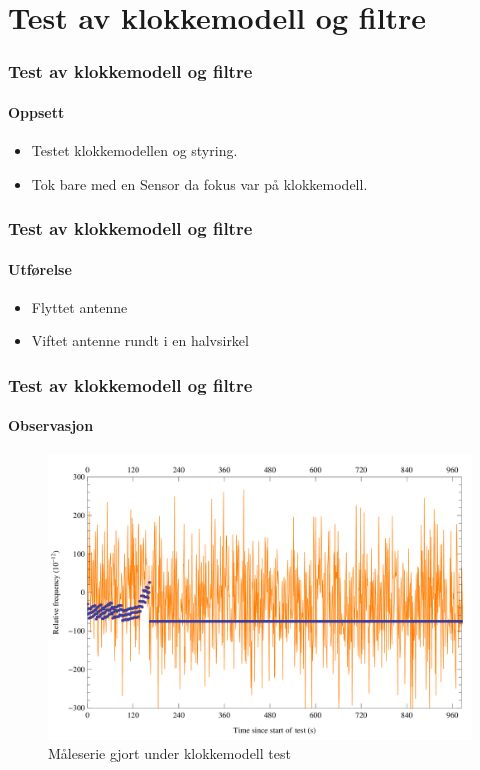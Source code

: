 \documentclass[xcolor=table]{beamer}
\begin{document}
\section{Test av klokkemodell og filtre}
\begin{frame}
\frametitle{Test av klokkemodell og filtre}
\framesubtitle{Oppsett}
  \begin{itemize}
        \setlength\itemsep{2em}
    \item Testet klokkemodellen og styring.
    \item Tok bare med en Sensor da fokus var på klokkemodell. 
  \end{itemize}
\end{frame}

\begin{frame}
\frametitle{Test av klokkemodell og filtre}
\framesubtitle{Utførelse}
      \begin{itemize}
            \setlength\itemsep{2em}
        \item Flyttet antenne 
        \item Viftet antenne rundt i en halvsirkel
      \end{itemize}
\end{frame}

\begin{frame}
\frametitle{Test av klokkemodell og filtre}
\framesubtitle{Observasjon}
      \begin{figure}
        \includegraphics[scale=0.18]{thesis/graphics/20161024-test2-telemetry-and-cnt91-combined-1-3.png}
        \caption{Måleserie gjort under klokkemodell test}
      \end{figure}
\end{frame}
\end{document}
